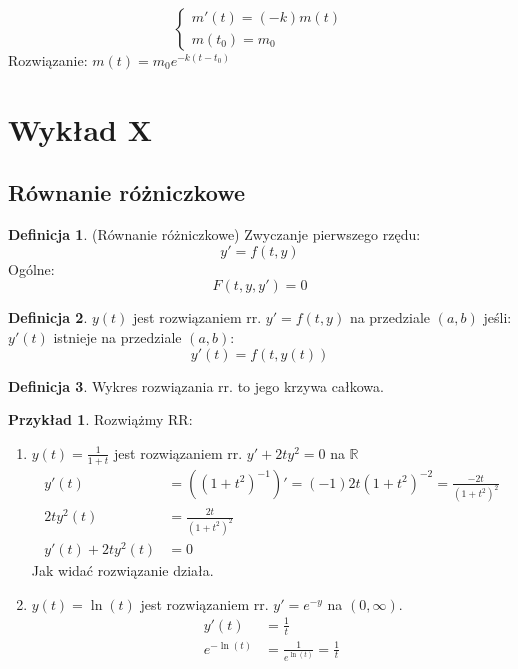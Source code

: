 \documentclass{article}
\theoremstyle{definition}
\newtheorem{de}{Definicja}[subsection]
\theoremstyle{definition}
\theoremstyle{definition}
\newtheorem{pk}{Przykład}[subsection]
\theoremstyle{definition}
\theoremstyle{definition}
\theoremstyle{definition}
\theoremstyle{definition}
\begin{document}
$$\begin{cases}
    m'(t)=(-k)m(t)\\
    m(t_0)=m_0
\end{cases}$$
Rozwiązanie:
$m(t)=m_0 e^{-k(t-t_0)}$

\section{Wykład X}

\subsection{Równanie różniczkowe}

\begin{de}
    (Równanie różniczkowe) Zwyczanje pierwszego rzędu:
    \[y' = f(t,y)\]
    Ogólne:
    \[F(t,y,y')=0\]
\end{de}

\begin{de}
    $y(t)$ jest rozwiązaniem rr. $y'=f(t,y)$ na przedziale $(a,b)$ jeśli:
    $y'(t)$ istnieje na przedziale $(a,b)$:
    \[y'(t)=f(t,y(t))\]
\end{de}

\begin{de}
    Wykres rozwiązania rr. to jego krzywa całkowa.
\end{de}

\begin{pk}
    Rozwiążmy RR:
    \begin{enumerate}
        \item $y(t) = \frac{1}{1+t}$ jest rozwiązaniem rr. $y' + 2ty^2 = 0$ na $\mathbb{R}$
        \begin{align}
            y'(t) &= ((1+t^2)^{-1})' = (-1)2t (1+t^2)^{-2} = \frac{-2t}{(1+t^2)^2}\\
            2t y^2(t) &= \frac{2t}{(1+t^2)^2}\\
            y'(t) + 2ty^2(t) &= 0
        \end{align}
        Jak widać rozwiązanie działa.
        \item $y(t)=\ln(t)$ jest rozwiązaniem rr. $y'=e^{-y}$ na $(0,\infty)$.
        \begin{align}
            y'(t) &= \frac{1}{t}\\
            e^{-\ln(t)} &= \frac{1}{e^{\ln(t)}} = \frac{1}{t}
        \end{align}
    \end{enumerate}
\end{pk}
\end{document}
